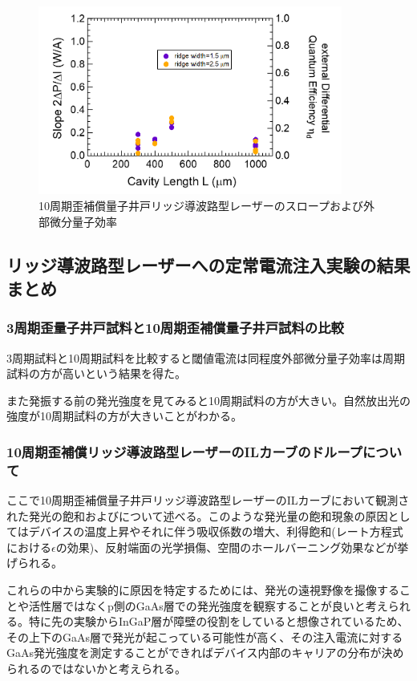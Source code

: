 {{\begin{figure}[ht]
	\centering
	\includegraphics[width=10cm]{figure/fig_3_2_10QW_ridge_slope.png}
		\caption{10周期歪補償量子井戸リッジ導波路型レーザーのスロープおよび外部微分量子効率}
		\label{fig:fig_3_2_10QW_ridge_slope}
\end{figure}

\subsection{リッジ導波路型レーザーへの定常電流注入実験の結果まとめ}
\subsubsection{3周期歪量子井戸試料と10周期歪補償量子井戸試料の比較}
3周期試料と10周期試料を比較すると閾値電流は同程度外部微分量子効率は周期試料の方が高いという結果を得た。

また発振する前の発光強度を見てみると10周期試料の方が大きい。自然放出光の強度が10周期試料の方が大きいことがわかる。
\subsubsection{10周期歪補償リッジ導波路型レーザーのILカーブのドループについて}
ここで10周期歪補償量子井戸リッジ導波路型レーザーのILカーブにおいて観測された発光の飽和およびについて述べる。このような発光量の飽和現象の原因としてはデバイスの温度上昇やそれに伴う吸収係数の増大、利得飽和(レート方程式における$\epsilon$の効果)、反射端面の光学損傷、空間のホールバーニング効果などが挙げられる。

これらの中から実験的に原因を特定するためには、発光の遠視野像を撮像することや活性層ではなくp側のGaAs層での発光強度を観察することが良いと考えられる。特に先の実験からInGaP層が障壁の役割をしていると想像されているため、その上下のGaAs層で発光が起こっている可能性が高く、その注入電流に対するGaAs発光強度を測定することができればデバイス内部のキャリアの分布が決められるのではないかと考えられる。

}}
